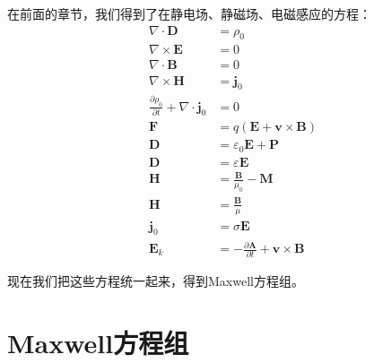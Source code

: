 \documentclass[12pt,onecolumn,a4paper]{book}
\numberwithin{table}{subsection}
\numberwithin{equation}{subsection}
\begin{document}
    在前面的章节，我们得到了在静电场、静磁场、电磁感应的方程：
    \begin{align}
        \nabla \cdot \mathbf{D}                                        & = \rho_0                                                                  \\
        \nabla \times \mathbf{E}                                       & = 0                                                                       \\
        \nabla \cdot \mathbf{B}                                        & = 0                                                                       \\
        \nabla \times \mathbf{H}                                       & = \mathbf{j}_0                                                            \\
        \frac{\partial \rho_0}{\partial t} + \nabla \cdot \mathbf{j}_0 & = 0                                                                       \\
        \mathbf{F}                                                     & = q(\mathbf{E} + \mathbf{v} \times \mathbf{B})                            \\
        \mathbf{D}                                                     & = \varepsilon_0 \mathbf{E} + \mathbf{P}                                   \\
        \mathbf{D}                                                     & = \varepsilon \mathbf{E}                                                  \\
        \mathbf{H}                                                     & = \frac{\mathbf{B}}{\mu_0} - \mathbf{M}                                   \\
        \mathbf{H}                                                     & = \frac{\mathbf{B}}{\mu}                                                  \\
        \mathbf{j}_0                                                   & = \sigma \mathbf{E}                                                       \\
        \mathbf{E}_k                                                   & = - \frac{\partial \mathbf{A}}{\partial t} + \mathbf{v} \times \mathbf{B}
    \end{align}

    现在我们把这些方程统一起来，得到Maxwell方程组。

    \section{Maxwell方程组}
\end{document}

